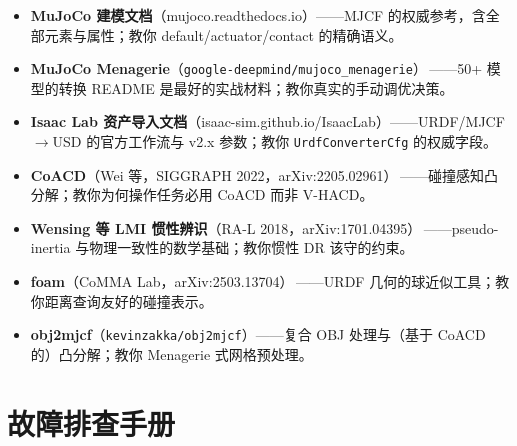 \begin{itemize}
  \item \textbf{MuJoCo 建模文档}（mujoco.readthedocs.io）——MJCF 的权威参考，含全部元素与属性；教你 default/actuator/contact 的精确语义。
  \item \textbf{MuJoCo Menagerie}（\texttt{google-deepmind/mujoco\_menagerie}）\,\cite{menagerie2022}——50+ 模型的转换 README 是最好的实战材料；教你真实的手动调优决策。
  \item \textbf{Isaac Lab 资产导入文档}（isaac-sim.github.io/IsaacLab）——URDF/MJCF$\to$USD 的官方工作流与 v2.x 参数；教你 \texttt{UrdfConverterCfg} 的权威字段。
  \item \textbf{CoACD}（Wei 等，SIGGRAPH 2022，arXiv:2205.02961）\,\cite{wei2022coacd}——碰撞感知凸分解；教你为何操作任务必用 CoACD 而非 V-HACD。
  \item \textbf{Wensing 等 LMI 惯性辨识}（RA-L 2018，arXiv:1701.04395）\,\cite{wensing2018lmi}——pseudo-inertia 与物理一致性的数学基础；教你惯性 DR 该守的约束。
  \item \textbf{foam}（CoMMA Lab，arXiv:2503.13704）\,\cite{foam2025}——URDF 几何的球近似工具；教你距离查询友好的碰撞表示。
  \item \textbf{obj2mjcf}（\texttt{kevinzakka/obj2mjcf}）——复合 OBJ 处理与（基于 CoACD 的）凸分解；教你 Menagerie 式网格预处理。
\end{itemize}

\section*{故障排查手册}
\label{sec:rlmc-assets-troubleshoot}

